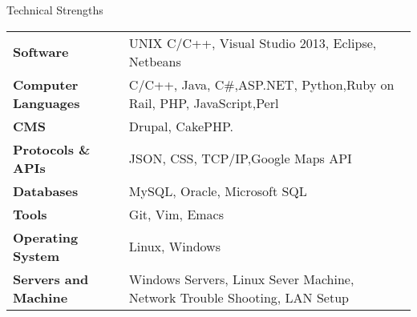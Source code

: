 \documentclass{resume} %
\begin{document}
\begin{rSection}{Technical Strengths}

\begin{tabular}{ @{} >{\bfseries}l @{\hspace{6ex}} l }
Software & UNIX C/C++, Visual Studio 2013, Eclipse, Netbeans\\
Computer Languages & C/C++, Java, C\#,ASP.NET, Python,Ruby on Rail, PHP, JavaScript,Perl \\
CMS & Drupal, CakePHP.\\
Protocols \& APIs  & JSON, CSS, TCP/IP,Google Maps API \\
Databases & MySQL, Oracle, Microsoft SQL \\
Tools & Git, Vim, Emacs\\

Operating System& Linux, Windows\\

Servers and Machine & Windows Servers, Linux Sever Machine, Network Trouble Shooting, LAN Setup
\end{tabular}
  
\end{rSection}






\end{document}
